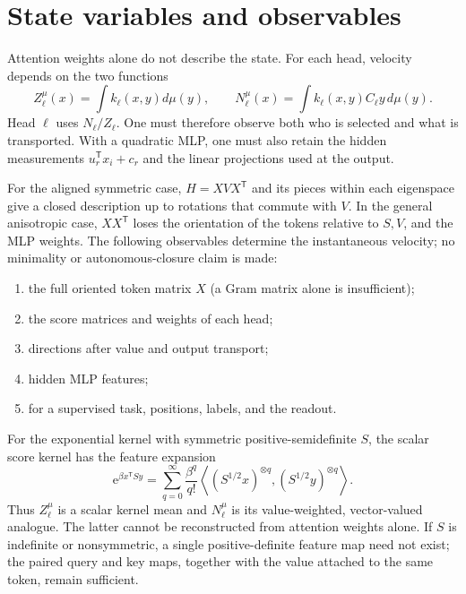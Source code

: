 \documentclass[11pt,a4paper]{article}
\theoremstyle{definition}
\newcommand{\T}{\mathsf T}
\newcommand{\e}{\mathrm e}
\begin{document}
\section{State variables and observables}
\label{sec:observable}

Attention weights alone do not describe the state. For each head, velocity depends on
the two functions
\begin{equation}
 Z_\ell^{\mu}(x)=\int k_\ell(x,y)d\mu(y),\qquad
 N_\ell^{\mu}(x)=\int k_\ell(x,y)C_\ell y\,d\mu(y).\label{eq:observables}
\end{equation}
Head $\ell$ uses $N_\ell/Z_\ell$. One must therefore observe both who is selected and what is
transported. With a quadratic MLP, one must also retain the hidden measurements
$u_r^{\T}x_i+c_r$ and the linear projections used at the output.

For the aligned symmetric case, $H=XVX^{\T}$ and its pieces within each eigenspace
give a closed description up to rotations that commute with $V$.  In the general
anisotropic case, $XX^{\T}$ loses the orientation of the tokens relative to
$S,V$, and the MLP weights.  The following observables determine the instantaneous
velocity; no minimality or autonomous-closure claim is made:
\begin{enumerate}
  \item the full oriented token matrix $X$ (a Gram matrix alone is insufficient);
  \item the score matrices and weights of each head;
  \item directions after value and output transport;
  \item hidden MLP features;
  \item for a supervised task, positions, labels, and the readout.
\end{enumerate}

For the exponential kernel with symmetric positive-semidefinite $S$, the scalar score
kernel has the feature expansion
\begin{equation}
 \e^{\beta x^{\T}Sy}
 =\sum_{q=0}^{\infty}\frac{\beta^q}{q!}
 \left\langle(S^{1/2}x)^{\otimes q},(S^{1/2}y)^{\otimes q}\right\rangle .
 \label{eq:exponential-features}
\end{equation}
Thus $Z_\ell^\mu$ is a scalar kernel mean and $N_\ell^\mu$ is its
value-weighted, vector-valued analogue.  The latter cannot be reconstructed from
attention weights alone.  If $S$ is indefinite or nonsymmetric, a single
positive-definite feature map need not exist; the paired query and key maps, together
with the value attached to the same token, remain sufficient.
\end{document}

